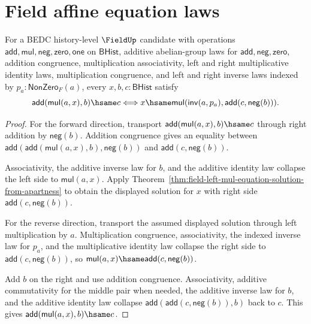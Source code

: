 \section{Field affine equation laws}\label{sec:field-affine-equation-laws}

\begin{theorem}
\label{thm:field-affine-left-equation-exact-from-apartness}
For a BEDC history-level $\FieldUp$ candidate with operations
$\mathsf{add},\mathsf{mul},\mathsf{neg},\mathsf{zero},\mathsf{one}$ on
$\mathsf{BHist}$, additive abelian-group laws for
$\mathsf{add},\mathsf{neg},\mathsf{zero}$, addition congruence,
multiplication associativity, left and right multiplicative identity laws,
multiplication congruence, and left and right inverse laws indexed by
$p_a:\mathsf{NonZero}_F(a)$, every
$x,b,c:\mathsf{BHist}$ satisfy
$$
\mathsf{add}(\mathsf{mul}(a,x),b)\hsame c
\Longleftrightarrow
x\hsame
\mathsf{mul}(\mathsf{inv}(a,p_a),\mathsf{add}(c,\mathsf{neg}(b))).
$$
\end{theorem}
\begin{proof}
For the forward direction, transport
$\mathsf{add}(\mathsf{mul}(a,x),b)\hsame c$ through right addition by
$\mathsf{neg}(b)$. Addition congruence gives an equality between
$\mathsf{add}(\mathsf{add}(\mathsf{mul}(a,x),b),\mathsf{neg}(b))$ and
$\mathsf{add}(c,\mathsf{neg}(b))$.

Associativity, the additive inverse law for $b$, and the additive identity law
collapse the left side to $\mathsf{mul}(a,x)$. Apply
Theorem~\ref{thm:field-left-mul-equation-solution-from-apartness} to obtain
the displayed solution for $x$ with right side
$\mathsf{add}(c,\mathsf{neg}(b))$.

For the reverse direction, transport the assumed displayed solution through
left multiplication by $a$. Multiplication congruence, associativity, the
indexed inverse law for $p_a$, and the multiplicative identity law collapse the
right side to $\mathsf{add}(c,\mathsf{neg}(b))$, so
$\mathsf{mul}(a,x)\hsame\mathsf{add}(c,\mathsf{neg}(b))$.

Add $b$ on the right and use addition congruence. Associativity, additive
commutativity for the middle pair when needed, the additive inverse law for
$b$, and the additive identity law collapse
$\mathsf{add}(\mathsf{add}(c,\mathsf{neg}(b)),b)$ back to $c$. This gives
$\mathsf{add}(\mathsf{mul}(a,x),b)\hsame c$.
\end{proof}

